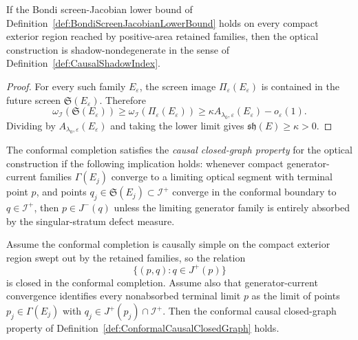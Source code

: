 \begin{lemma}\label{lem:ScreenJacobianShadowNondegeneracy}
If the Bondi screen-Jacobian lower bound of Definition~\ref{def:BondiScreenJacobianLowerBound} holds on every compact exterior region reached by positive-area retained families, then the optical construction is shadow-nondegenerate in the sense of Definition~\ref{def:CausalShadowIndex}.
\end{lemma}

\begin{proof}
For every such family $E_\varepsilon$, the screen image $\Pi_\varepsilon(E_\varepsilon)$ is contained in the future screen $\mathfrak S(E_\varepsilon)$. Therefore
\[
    \omega_{\mathscr I}(\mathfrak S(E_\varepsilon))
    \ge
    \omega_{\mathscr I}(\Pi_\varepsilon(E_\varepsilon))
    \ge
    \kappa A_{\lambda_0,\varepsilon}(E_\varepsilon)-o_\varepsilon(1).
\]
Dividing by $A_{\lambda_0,\varepsilon}(E_\varepsilon)$ and taking the lower limit gives $\mathfrak{sh}(E)\ge\kappa>0$.
\end{proof}

\begin{definition}\label{def:ConformalCausalClosedGraph}
The conformal completion satisfies the \emph{causal closed-graph property} for the optical construction if the following implication holds: whenever compact generator-current families $\Gamma(E_j)$ converge to a limiting optical segment with terminal point $p$, and points $q_j\in \mathfrak S(E_j)\subset\mathscr I^+$ converge in the conformal boundary to $q\in\mathscr I^+$, then $p\in J^-(q)$ unless the limiting generator family is entirely absorbed by the singular-stratum defect measure.
\end{definition}

\begin{lemma}\label{lem:CausalSimplicityClosedGraph}
Assume the conformal completion is causally simple on the compact exterior region swept out by the retained families, so the relation
\[
    \{(p,q):q\in J^+(p)\}
\]
is closed in the conformal completion. Assume also that generator-current convergence identifies every nonabsorbed terminal limit $p$ as the limit of points $p_j\in\Gamma(E_j)$ with $q_j\in J^+(p_j)\cap\mathscr I^+$. Then the conformal causal closed-graph property of Definition~\ref{def:ConformalCausalClosedGraph} holds.
\end{lemma}


